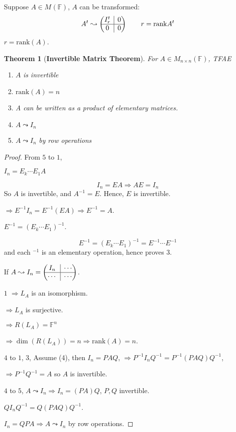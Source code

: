 \documentclass[12pt]{article}
\theoremstyle{plain}
\newtheorem{theorem}{Theorem}[subsection]
\newcommand{\rank}{\mathrm{rank}}
\newcommand{\mF}{{\mathbb{F}}}
\newcommand{\rvline}{\hspace*{-\arraycolsep}\vline\hspace*{-\arraycolsep}}
\begin{document}
Suppose $A \in M_{}(\mF)$, $A$ can be transformed: 
\[
	A^t \leadsto 
	\begin{pmatrix}
		I_r^t & \rvline & 0 \\ \hline
		0 & \rvline & 0
	\end{pmatrix}
	\qquad r = \rank A^t
\]
$r = \rank(A)$. 

\begin{theorem}[\textbf{Invertible Matrix Theorem}]
	For $A \in M_{n\times n}(\mF)$, TFAE
	\begin{enumerate}
		\item $A$ is invertible
		\item $\rank(A) = n$
		\item A can be written as a product of elementary matrices. 
		\item $A \leadsto I_n$
		\item $A \leadsto I_n$ by row operations
	\end{enumerate}
\end{theorem}
\begin{proof}
	From $5$ to $1$, 

	$I_n = E_k\cdots E_1A$ 

	\[
		I_n = EA \Rightarrow AE = I_n
	\]
	So $A$ is invertible, and $A^{-1} = E$. Hence, $E$ is invertible. 

	$\Rightarrow E^{-1} I_n = E^{-1}(EA) \Rightarrow E^{-1} = A$. 

	$E^{-1} = (E_k \cdots E_1)^{-1}$. 

	\[
		E^{-1} = (E_k\cdots E_1)^{-1} = E^{-1} \cdots E^{-1}
	\]
	and each $^{-1}$ is an elementary operation, hence proves 3. 

	If $A \leadsto I_n = 
	\begin{pmatrix}
		I_n & \rvline& \cdots \\ \hline
		\cdots &\rvline &\cdots \\
	\end{pmatrix}
	$.

	$1$ 
	$\Rightarrow L_A$ is an isomorphism.

	$\Rightarrow L_A$ is surjective.  
	
	$\Rightarrow R(L_A) = \mF^n$ 

	$\Rightarrow \dim(R(L_A)) = n \Rightarrow \rank(A) = n$. 

	$4$ to $1$, $3$, Assume (4), then $I_n = PAQ$, 
	$\Rightarrow P^{-1}I_nQ^{-1} = P^{-1}(PAQ)Q^{-1}$,

	$\Rightarrow P^{-1}Q^{-1} = A$ so $A$ is invertible. 

	$4$ to $5$, 
	$A \leadsto I_n \Rightarrow I_n = (PA)Q$, $P, Q$ invertible. 

	$QI_nQ^{-1} = Q(PAQ)Q^{-1}$. 

	$I_n = QPA \Rightarrow A \leadsto I_n$ by row operations. 

\end{proof}
\end{document}

